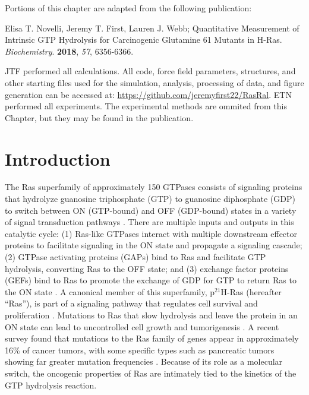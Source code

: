 Portions of this chapter are adapted from the following publication: 

\noindent Elisa T. Novelli, Jeremy T. First, Lauren J. Webb; Quantitative Measurement of Intrinsic GTP Hydrolysis for Carcinogenic Glutamine 61 Mutants in H-Ras. \emph{Biochemistry}. \textbf{2018}, \emph{57}, 6356-6366.

JTF performed all calculations.
All code, force field parameters, structures, and other starting files used for the simulation, analysis, processing of data, and figure generation can be accessed at:
\url{https://github.com/jeremyfirst22/RasRal}. 
ETN performed all experiments. The experimental methods are ommited from this Chapter, but they may be found in the publication.

\section{Introduction} \label{ras-intro}

The Ras superfamily of approximately 150 GTPases consists of signaling proteins that hydrolyze guanosine triphosphate (GTP) to guanosine diphosphate (GDP) to switch between ON (GTP-bound) and OFF (GDP-bound) states in a variety of signal transduction pathways \cite{Bourne1991, Krauss2003}.
There are multiple inputs and outputs in this catalytic cycle: (1) Ras-like GTPases interact with multiple downstream effector proteins to facilitate signaling in the ON state and propagate a signaling cascade; (2) GTPase activating proteins (GAPs) bind to Ras and facilitate GTP hydrolysis, converting Ras to the OFF state; and (3) exchange factor proteins (GEFs) bind to Ras to promote the exchange of GDP for GTP to return Ras to the ON state \cite{Krauss2003, Cherfils2013, Khrenova2015}.
A canonical member of this superfamily, p$^{21}$H-Ras (hereafter ``Ras''), is part of a signaling pathway that regulates cell survival and proliferation \cite{Shields2000, Cox2003, Downward2003, Repasky2004, Prior2012}.
Mutations to Ras that slow hydrolysis and leave the protein in an ON state can lead to uncontrolled cell growth and tumorigenesis \cite{Prior2012}. 
A recent survey found that mutations to the Ras family of genes appear in approximately 16\% of cancer tumors, with some specific types such as pancreatic tumors showing far greater mutation frequencies \cite{Prior2012}. 
Because of its role as a molecular switch, the oncogenic properties of Ras are intimately tied to the kinetics of the GTP hydrolysis reaction.

